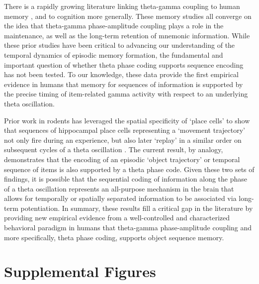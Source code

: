 There is a rapidly growing literature linking theta-gamma coupling to
human memory
\autocites{canolty_high_2006}{axmacher_cross-frequency_2010}{mormann_phase/amplitude_2005}{fuentemilla_theta-coupled_2010}{maris_spatially_2011}{friese_successful_2013}{lisman_-_2013}
, and to cognition more generally. These memory studies all converge on
the idea that theta-gamma phase-amplitude coupling plays a role in the
maintenance, as well as the long-term retention of mnemonic information.
While these prior studies have been critical to advancing our
understanding of the temporal dynamics of episodic memory formation, the
fundamental and important question of whether theta phase coding
supports sequence encoding has not been tested. To our knowledge, these
data provide the first empirical evidence in humans that memory for
sequences of information is supported by the precise timing of
item-related gamma activity with respect to an underlying theta
oscillation.

Prior work in rodents has leveraged the spatial specificity of `place
cells' \autocites{okeefe_hippocampus_1971}{okeefe_review_1979} to show
that sequences of hippocampal place cells representing a `movement
trajectory' not only fire during an experience, but also later `replay'
in a similar order on subsequent cycles of a theta oscillation
\autocites{gupta_segmentation_2012}{johnson_neural_2007}{wikenheiser_hippocampal_2015}{foster_hippocampal_2007}{pastalkova_internally_2008}{dragoi_temporal_2006}.
The current result, by analogy, demonstrates that the encoding of an
episodic `object trajectory' or temporal sequence of items is also
supported by a theta phase code. Given these two sets of findings, it is
possible that the sequential coding of information along the phase of a
theta oscillation represents an all-purpose mechanism in the brain that
allows for temporally or spatially separated information to be
associated via long-term potentiation. In summary, these results fill a
critical gap in the literature by providing new empirical evidence from
a well-controlled and characterized behavioral paradigm in humans that
theta-gamma phase-amplitude coupling and more specifically, theta phase
coding, supports object sequence memory.

\section{Supplemental Figures}\label{supplemental-figures}

